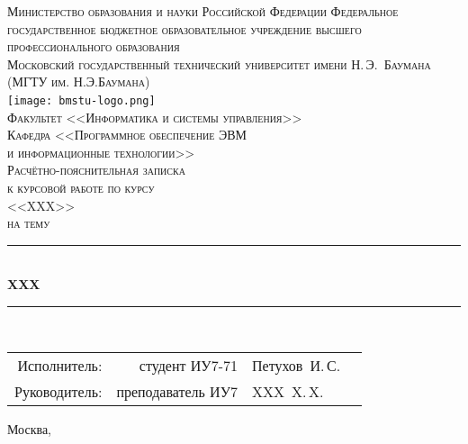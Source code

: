 \newcommand{\HRule}{\rule{\linewidth}{0.5mm}}

\begin{center}

\textsc{Министерство образования и науки Российской Федерации
Федеральное государственное бюджетное образовательное учреждение 
высшего профессионального образования}\\[0.5cm]

\textsc{\large Московский государственный технический университет имени Н.\,Э.~Баумана}\\
\textsc{(МГТУ им. Н.Э.Баумана)}\\[0.5cm]
\texttt{[image: bmstu-logo.png]}~\\

\textsc{Факультет <<Информатика и системы управления>>}\\
\textsc{Кафедра <<Программное обеспечение ЭВМ\\и информационные технологии>>}\\[1cm]


\textsc{\huge Расчётно-пояснительная записка}\\
\textsc{к курсовой работе по курсу}\\
\textsc{\large<<XXX>>}\\
\textsc{на тему}\\

\HRule \\[0.5cm]
{\huge \bfseries XXX}
\HRule \\[0.5cm]

\vfill

\begin{flushright}
  \begin{tabular}{rrlc}
    Исполнитель:  &    студент ИУ7-71 & Петухов~И.\,С.  & \underline{\hspace{3cm}} \\[1cm]
    Руководитель: & преподаватель ИУ7 & XXX~X.\,X. & \underline{\hspace{3cm}} \\[1cm]
  \end{tabular}
\end{flushright}

{\large Москва, \the\year}

\end{center}

\newpage
{}